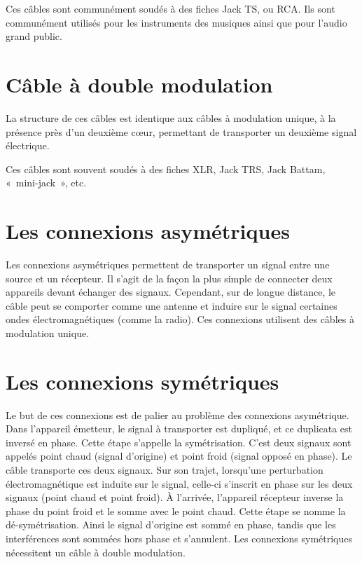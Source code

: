 \documentclass[
]{book}
\begin{document}
Ces câbles sont communément soudés à des fiches Jack TS, ou RCA. Ils sont communément utilisés pour les instruments des musiques ainsi que pour l'audio grand public.

\hypertarget{cuxe2ble-uxe0-double-modulation}{%
\section{Câble à double modulation}\label{cuxe2ble-uxe0-double-modulation}}

La structure de ces câbles est identique aux câbles à modulation unique, à la présence près d'un deuxième cœur, permettant de transporter un deuxième signal électrique.

Ces câbles sont souvent soudés à des fiches XLR, Jack TRS, Jack Battam, «~mini-jack~», etc.

\hypertarget{les-connexions-asymuxe9triques}{%
\section{Les connexions asymétriques}\label{les-connexions-asymuxe9triques}}

Les connexions asymétriques permettent de transporter un signal entre une source et un récepteur. Il s'agit de la façon la plus simple de connecter deux appareils devant échanger des signaux. Cependant, sur de longue distance, le câble peut se comporter comme une antenne et induire sur le signal certaines ondes électromagnétiques (comme la radio). Ces connexions utilisent des câbles à modulation unique.

\hypertarget{les-connexions-symuxe9triques}{%
\section{Les connexions symétriques}\label{les-connexions-symuxe9triques}}

Le but de ces connexions est de palier au problème des connexions asymétrique. Dans l'appareil émetteur, le signal à transporter est dupliqué, et ce duplicata est inversé en phase. Cette étape s'appelle la symétrisation. C'est deux signaux sont appelés point chaud (signal d'origine) et point froid (signal opposé en phase). Le câble transporte ces deux signaux. Sur son trajet, lorsqu'une perturbation électromagnétique est induite sur le signal, celle-ci s'inscrit en phase sur les deux signaux (point chaud et point froid). À l'arrivée, l'appareil récepteur inverse la phase du point froid et le somme avec le point chaud. Cette étape se nomme la dé-symétrisation. Ainsi le signal d'origine est sommé en phase, tandis que les interférences sont sommées hors phase et s'annulent.
Les connexions symétriques nécessitent un câble à double modulation.
\end{document}
